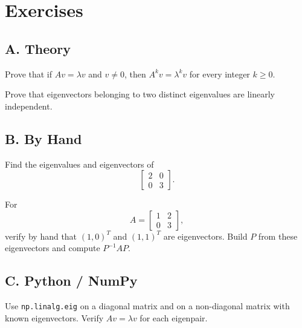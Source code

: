\section*{Exercises}

\subsection*{A. Theory}

\begin{exercise}
Prove that if $Av=\lambda v$ and $v\neq 0$, then $A^kv=\lambda^kv$ for every
integer $k\geq 0$.
\end{exercise}

\begin{exercise}
Prove that eigenvectors belonging to two distinct eigenvalues are linearly
independent.
\end{exercise}

\subsection*{B. By Hand}

\begin{exercise}
Find the eigenvalues and eigenvectors of
\[
  \begin{bmatrix}2&0\\0&3\end{bmatrix}.
\]
\end{exercise}

\begin{exercise}
For
\[
  A=\begin{bmatrix}1&2\\0&3\end{bmatrix},
\]
verify by hand that $(1,0)^T$ and $(1,1)^T$ are eigenvectors. Build $P$ from
these eigenvectors and compute $P^{-1}AP$.
\end{exercise}

\subsection*{C. Python / NumPy}

\begin{exercise}
Use \texttt{np.linalg.eig} on a diagonal matrix and on a non-diagonal matrix
with known eigenvectors. Verify $Av=\lambda v$ for each eigenpair.
\end{exercise}

